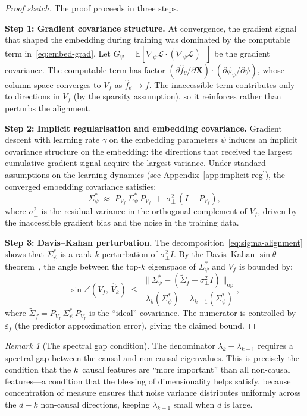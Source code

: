 \documentclass[11pt,a4paper]{article}
\theoremstyle{plain}
\theoremstyle{definition}
\theoremstyle{remark}
\newtheorem{remark}[theorem]{Remark}
\newcommand{\E}{\mathbb{E}}
\newcommand{\cL}{\mathcal{L}}
\newcommand{\norm}[1]{\| #1 \|}
\begin{document}
\begin{proof}[Proof sketch]
The proof proceeds in three steps.

\textbf{Step 1: Gradient covariance structure.}
At convergence, the gradient signal that shaped the embedding during training was
dominated by the computable term in~\eqref{eq:embed-grad}.  Let
$G_\psi = \E[\nabla_\psi \cL \cdot (\nabla_\psi \cL)^\top]$ be the gradient
covariance.  The computable term has factor
$(\partial\hat{f}_\theta/\partial\mathbf{X})\cdot(\partial\phi_\psi/\partial\psi)$,
whose column space converges to $V_f$ as $\hat{f}_\theta \to f$.  The
inaccessible term contributes only to directions in $V_f$ (by the sparsity
assumption), so it reinforces rather than perturbs the alignment.

\textbf{Step 2: Implicit regularisation and embedding covariance.}
Gradient descent with learning rate $\gamma$ on the embedding parameters $\psi$
induces an implicit covariance structure on the embedding: the directions that
received the largest cumulative gradient signal acquire the largest variance.
Under standard assumptions on the learning dynamics (see
Appendix~\ref{app:implicit-reg}), the converged embedding covariance satisfies:
\begin{equation}\label{eq:sigma-alignment}
  \Sigma_\psi^* \;\approx\;
  P_{V_f}\,\Sigma_\psi^*\,P_{V_f} \;+\; \sigma_\perp^2\,(I - P_{V_f}),
\end{equation}
where $\sigma_\perp^2$ is the residual variance in the orthogonal complement of
$V_f$, driven by the inaccessible gradient bias and the noise in the training
data.

\textbf{Step 3: Davis--Kahan perturbation.}
The decomposition~\eqref{eq:sigma-alignment} shows that $\Sigma_\psi^*$ is a
rank-$k$ perturbation of $\sigma_\perp^2 I$.  By the Davis--Kahan
$\sin\theta$ theorem~\citep{davis1970rotation}, the angle between the top-$k$
eigenspace of $\Sigma_\psi^*$ and $V_f$ is bounded by:
\[
  \sin\angle(V_f,\,\hat{V}_k)
  \;\leq\;
  \frac{\norm{\Sigma_\psi^* - (\tilde{\Sigma}_f + \sigma_\perp^2 I)}_{\mathrm{op}}}
       {\lambda_k(\Sigma_\psi^*) - \lambda_{k+1}(\Sigma_\psi^*)},
\]
where $\tilde{\Sigma}_f = P_{V_f}\,\Sigma_\psi^*\,P_{V_f}$ is the ``ideal''
covariance.  The numerator is controlled by $\varepsilon_f$ (the predictor
approximation error), giving the claimed bound.
\end{proof}

\begin{remark}[The spectral gap condition]
The denominator $\lambda_k - \lambda_{k+1}$ requires a spectral gap between the
causal and non-causal eigenvalues.  This is precisely the condition that the
$k$~causal features are ``more important'' than all non-causal features---a
condition that the blessing of dimensionality helps satisfy, because
concentration of measure ensures that noise variance distributes uniformly across
the $d - k$ non-causal directions, keeping $\lambda_{k+1}$ small when $d$ is
large.
\end{remark}
\end{document}

